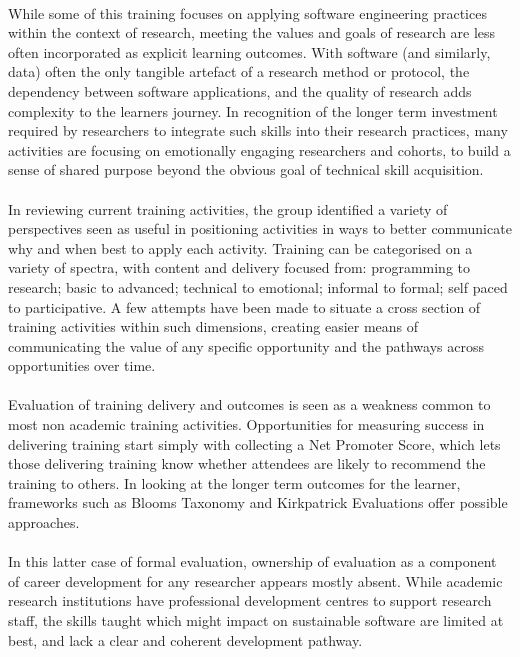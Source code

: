 \paragraph{}
While some of this training focuses on applying software engineering practices within the context of research, meeting the values and goals of research are less often incorporated as explicit learning outcomes. With software (and similarly, data) often the only tangible artefact of a research method or protocol, the dependency between software applications, and the quality of research adds complexity to the learners journey. In recognition of the longer term investment required by researchers to integrate such skills into their research practices, many activities are focusing on emotionally engaging researchers and cohorts, to build a sense of shared purpose beyond the obvious goal of technical skill acquisition.
\paragraph{}
In reviewing current training activities, the group identified a variety of perspectives seen as useful in positioning activities in ways to better communicate why and when best to apply each activity. Training can be categorised on a variety of spectra, with content and delivery focused from: programming to research; basic to advanced; technical to emotional; informal to formal; self paced to participative. A few attempts have been made to situate a cross section of training activities within such dimensions, creating easier means of communicating the value of any specific opportunity and the pathways across opportunities over time.
\paragraph{}
Evaluation of training delivery and outcomes is seen as a weakness common to most non academic training activities. Opportunities for measuring success in delivering training start simply with collecting a Net Promoter Score, which lets those delivering training know whether attendees are likely to recommend the training to others. In looking at the longer term outcomes for the learner, frameworks such as Blooms Taxonomy and Kirkpatrick Evaluations offer possible approaches.
\paragraph{}
In this latter case of formal evaluation, ownership of evaluation as a component of career development for any researcher appears mostly absent. While academic research institutions have professional development centres to support research staff, the skills taught which might impact on sustainable software are limited at best, and lack a clear and coherent development pathway.
